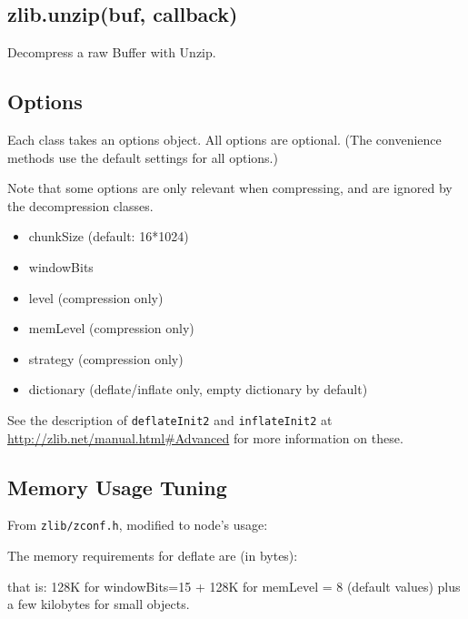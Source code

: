 \subsection{zlib.unzip(buf, callback)}

Decompress a raw Buffer with Unzip.

\subsection{Options}

Each class takes an options object. All options are optional. (The
convenience methods use the default settings for all options.)

Note that some options are only relevant when compressing, and are
ignored by the decompression classes.

\begin{itemize}
\item
  chunkSize (default: 16*1024)
\item
  windowBits
\item
  level (compression only)
\item
  memLevel (compression only)
\item
  strategy (compression only)
\item
  dictionary (deflate/inflate only, empty dictionary by default)
\end{itemize}

See the description of \texttt{deflateInit2} and \texttt{inflateInit2}
at \url{http://zlib.net/manual.html#Advanced} for more information on
these.

\subsection{Memory Usage Tuning}

From \texttt{zlib/zconf.h}, modified to node's usage:

The memory requirements for deflate are (in bytes):

\begin{Shaded}
\begin{Highlighting}[]
\NormalTok{(} \NormalTok{)) +  (} \NormalTok{))}
\end{Highlighting}
\end{Shaded}

that is: 128K for windowBits=15 + 128K for memLevel = 8 (default values)
plus a few kilobytes for small objects.

